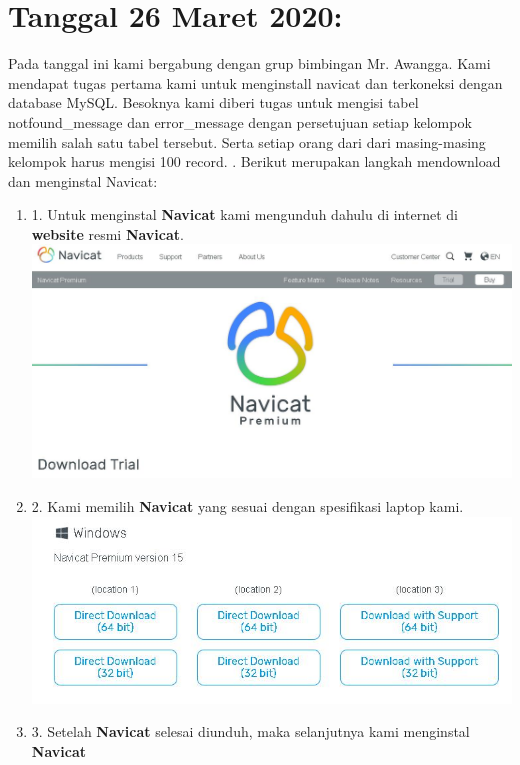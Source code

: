 \documentclass{article}
\begin{document}
\section{Tanggal 26 Maret 2020:}
\newline
Pada tanggal ini kami bergabung dengan grup bimbingan Mr. Awangga. Kami mendapat tugas pertama kami untuk menginstall navicat dan terkoneksi dengan database MySQL. Besoknya kami diberi tugas untuk mengisi tabel notfound_message dan error_message dengan persetujuan setiap kelompok memilih salah satu tabel tersebut. Serta setiap orang dari dari masing-masing kelompok harus mengisi 100 record. . Berikut merupakan langkah mendownload dan menginstal Navicat:
\newline
\begin{enumerate}
        \item 1. Untuk menginstal \textbf{Navicat} kami mengunduh dahulu di internet di \textbf{website} resmi \textbf{Navicat}.
        \newline
        \includegraphics[scale=0.3]{26.1.jpg}
        \newline
        \item 2. Kami memilih \textbf{Navicat} yang sesuai dengan spesifikasi laptop kami.
        \newline
        \includegraphics[scale=0.5]{26.2.jpg}
        \newline
        \item 3. Setelah \textbf{Navicat} selesai diunduh, maka selanjutnya kami menginstal \textbf{Navicat}

\end{enumerate}
\end{document}

